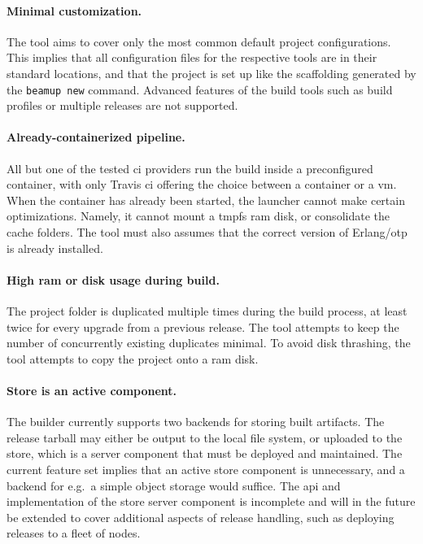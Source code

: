 \paragraph{Minimal customization.} The tool aims to cover only the most common default project configurations. This implies that all configuration files for the respective tools are in their standard locations, and that the project is set up like the scaffolding generated by the \lstinline|beamup new| command. Advanced features of the build tools such as build profiles or multiple releases are not supported.

\paragraph{Already-containerized pipeline.} All but one of the tested \acrshort{ci} providers run the build inside a preconfigured container, with only Travis \acrshort{ci} offering the choice between a container or a \acrshort{vm}. When the container has already been started, the launcher cannot make certain optimizations. Namely, it cannot mount a \acrshort{tmpfs} \acrshort{ram} disk, or consolidate the cache folders. The tool must also assumes that the correct version of Erlang/\acrshort{otp} is already installed.

\paragraph{High \acrshort{ram} or disk usage during build.} The project folder is duplicated multiple times during the build process, at least twice for every upgrade from a previous release. The tool attempts to keep the number of concurrently existing duplicates minimal. To avoid disk thrashing, the tool attempts to copy the project onto a \acrshort{ram} disk.

\paragraph{Store is an active component.} The builder currently supports two backends for storing built artifacts. The release tarball may either be output to the local file system, or uploaded to the store, which is a server component that must be deployed and maintained. The current feature set implies that an active store component is unnecessary, and a backend for e.g.~a simple object storage would suffice. The \acrshort{api} and implementation of the store server component is incomplete and will in the future be extended to cover additional aspects of release handling, such as deploying releases to a fleet of nodes.

